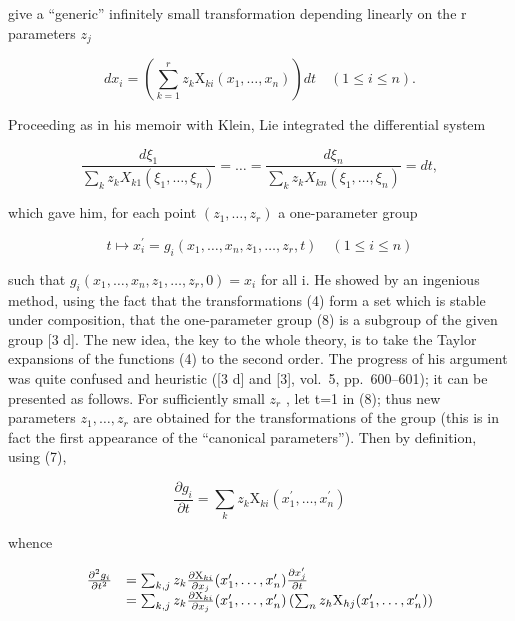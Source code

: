 give a ``generic'' infinitely small transformation depending linearly on the r parameters \(z_{j}\)

\[
d x _ {i} = \left(\sum_ {k = 1} ^ {r} z _ {k} \mathrm{X} _ {k i} (x _ {1}, \dots , x _ {n})\right) d t \quad (1 \leqslant i \leqslant n).\tag{6}
\]

Proceeding as in his memoir with Klein, Lie integrated the differential system

\[
\frac {d \xi_ {1}}{\sum_ {k} z _ {k} X _ {k 1} (\xi_ {1} , \dots , \xi_ {n})} = \dots = \frac {d \xi_ {n}}{\sum_ {k} z _ {k} X _ {k n} (\xi_ {1} , \dots , \xi_ {n})} = d t,\tag{7}
\]

which gave him, for each point \((z_{1},\ldots,z_{r})\) a one-parameter group

\[
t \mapsto x _ {i} ^ {\prime} = g _ {i} (x _ {1}, \dots , x _ {n}, z _ {1}, \dots , z _ {r}, t) \quad (1 \leqslant i \leqslant n)\tag{8}
\]

such that \(g_{i}(x_{1},\ldots,x_{n},z_{1},\ldots,z_{r},0)=x_{i}\) for all i. He showed by an ingenious method, using the fact that the transformations (4) form a set which is stable under composition, that the one-parameter group (8) is a subgroup of the given group {[}3 d{]}. The new idea, the key to the whole theory, is to take the Taylor expansions of the functions (4) to the second order. The progress of his argument was quite confused and heuristic ({[}3 d{]} and {[}3{]}, vol.~5, pp.~600--601); it can be presented as follows. For sufficiently small \(z_{r}\) , let t=1 in (8); thus new parameters \(z_{1},\ldots,z_{r}\) are obtained for the transformations of the group (this is in fact the first appearance of the ``canonical parameters''). Then by definition, using (7),

\[
\frac {\partial g _ {i}}{\partial t} = \sum_ {k} z _ {k} \mathrm{X} _ {k i} (x _ {1} ^ {\prime}, \dots , x _ {n} ^ {\prime})
\]

whence

\[
\begin{array}{r l} \frac {\partial^ {2} g _ {i}}{\partial t ^ {2}} & = \sum_ {k, j} z _ {k} \frac {\partial \mathrm{X} _ {k i}}{\partial x _ {j}} (x _ {1} ^ {\prime}, \ldots , x _ {n} ^ {\prime}) \frac {\partial x _ {j} ^ {\prime}}{\partial t} \\ & = \sum_ {k, j} z _ {k} \frac {\partial \mathrm{X} _ {k i}}{\partial x _ {j}} (x _ {1} ^ {\prime}, \ldots , x _ {n} ^ {\prime}) \left(\sum_ {n} z _ {h} \mathrm{X} _ {h j} (x _ {1} ^ {\prime}, \ldots , x _ {n} ^ {\prime})\right) \end{array}
\]

